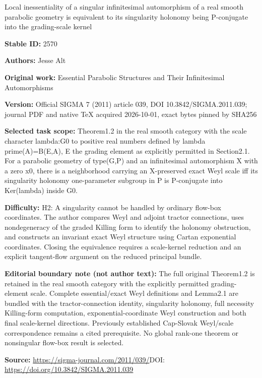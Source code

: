 \documentclass[11pt]{article}
\theoremstyle{plain}
\theoremstyle{definition}
\begin{document}
\begin{center}\Large Local inessentiality of a singular infinitesimal automorphism of a real smooth parabolic geometry is equivalent to its singularity holonomy being P-conjugate into the grading-scale kernel\end{center}
\noindent\textbf{Stable ID:} 2570\par
\noindent\textbf{Authors:} Jesse Alt\par
\noindent\textbf{Original work:} Essential Parabolic Structures and Their Infinitesimal Automorphisms\par
\noindent\textbf{Version:} Official SIGMA 7 (2011) article 039, DOI 10.3842/SIGMA.2011.039; journal PDF and native TeX acquired 2026-10-01, exact bytes pinned by SHA256\par
\noindent\textbf{Selected task scope:} Theorem1.2 in the real smooth category with the scale character lambda:G0 to positive real numbers defined by lambda prime(A)=\allowbreak{}B(E,A), E the grading element as explicitly permitted in Section2.1. For a parabolic geometry of type(G,P) and an infinitesimal automorphism X with a zero x0, there is a neighborhood carrying an X-preserved exact Weyl scale iff its singularity holonomy one-parameter subgroup in P is P-conjugate into Ker(lambda) inside G0.\par
\noindent\textbf{Difficulty:} H2: A singularity cannot be handled by ordinary flow-box coordinates. The author compares Weyl and adjoint tractor connections, uses nondegeneracy of the graded Killing form to identify the holonomy obstruction, and constructs an invariant exact Weyl structure using Cartan exponential coordinates. Closing the equivalence requires a scale-kernel reduction and an explicit tangent-flow argument on the reduced principal bundle.\par
\noindent\textbf{Editorial boundary note (not author text):} The full original Theorem1.2 is retained in the real smooth category with the explicitly permitted grading-element scale. Complete essential/exact Weyl definitions and Lemma2.1 are bundled with the tractor-connection identity, singularity holonomy, full necessity Killing-form computation, exponential-coordinate Weyl construction and both final scale-kernel directions. Previously established Cap-Slovak Weyl/scale correspondence remains a cited prerequisite. No global rank-one theorem or nonsingular flow-box result is selected.\par
\noindent\textbf{Source:} \url{https://sigma-journal.com/2011/039/}\quad DOI: \url{https://doi.org/10.3842/SIGMA.2011.039}\par
\end{document}

